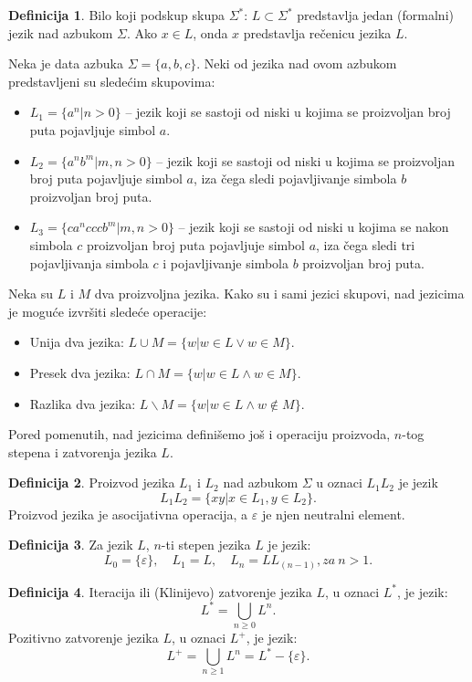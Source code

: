 \documentclass[12pt,oneside]{memoir}
\theoremstyle{plain}
\theoremstyle{definition}
\newtheorem{defn}{Definicija} %
\begin{document}
\begin{defn}
Bilo koji podskup skupa $\Sigma^*$: $L \subset \Sigma^*$ predstavlja jedan (formalni) jezik nad azbukom $\Sigma$. Ako $x \in L$, onda $x$ predstavlja rečenicu jezika $L$.
\end{defn}

Neka je data azbuka $\Sigma = \{ a, b, c\}$. Neki od jezika nad ovom azbukom predstavljeni su sledećim skupovima:
\begin{itemize}
\item[] $L_1 = \{a^n | n > 0\}$ – jezik koji se sastoji od niski u kojima se proizvoljan broj puta pojavljuje simbol $a$.
\item[] $L_2 = \{a^nb^m | m, n > 0\}$ – jezik koji se sastoji od niski u kojima se proizvoljan broj puta pojavljuje simbol $a$, iza čega sledi pojavljivanje simbola $b$ proizvoljan broj puta.
\item[] $L_3 = \{ca^ncccb^m | m, n > 0\}$ – jezik koji se sastoji od niski u kojima se nakon simbola $c$ proizvoljan broj puta pojavljuje simbol $a$, iza čega sledi tri pojavljivanja simbola $c$ i pojavljivanje simbola $b$ proizvoljan broj puta.
\end{itemize}

Neka su $L$ i $M$ dva proizvoljna jezika. Kako su i sami jezici skupovi, nad jezicima je moguće izvršiti sledeće operacije:
\begin{itemize}
\item Unija dva jezika: $L \cup M = \{w| w \in L \vee w\in M \}$.
\item Presek dva jezika: $L \cap M = \{w| w \in L \wedge w\in M \}$.
\item Razlika dva jezika: $L \backslash M = \{w| w \in L \wedge w\notin M \}$.
\end{itemize}
 Pored pomenutih, nad jezicima definišemo još i operaciju proizvoda, $n$-tog stepena i zatvorenja jezika $L$.
\begin{defn}
Proizvod jezika $L_1$ i $L_2$ nad azbukom $\Sigma$ u oznaci $L_1L_2$ je jezik $$L_1L_2 = \{xy | x \in L_1, y \in L_2\}.$$
Proizvod jezika je asocijativna operacija, a {$\varepsilon$} je njen neutralni element.
\end{defn}

\begin{defn}
Za jezik $L$, $n$-ti stepen jezika $L$ je jezik: 
$$L_0 = \{ \varepsilon\},\quad L_1 = L,\quad L_n = LL_(n-1), za\  n>1.$$ 
\end{defn}

\begin{defn}
Iteracija ili (Klinijevo) zatvorenje jezika $L$, u oznaci $L^*$, je jezik:
$$ L^* = \bigcup_{n\geq0}L^n.$$
Pozitivno zatvorenje jezika $L$, u oznaci $L^+$, je jezik:
$$ L^+ = \bigcup_{n\geq1}L^n = L^* - \{\varepsilon\}.$$
\end{defn}
\end{document}
